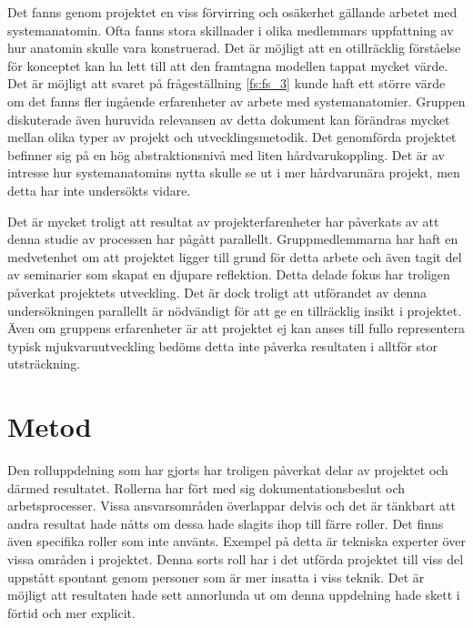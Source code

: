 

Det fanns genom projektet en viss förvirring och osäkerhet gällande arbetet med systemanatomin. Ofta fanns stora skillnader i olika medlemmars uppfattning av hur anatomin skulle vara konstruerad. Det är möjligt att en otillräcklig förståelse för konceptet kan ha lett till att den framtagna modellen tappat mycket värde. Det är möjligt att svaret på frågeställning \ref{fs:fs_3} kunde haft ett större värde om det fanns fler ingående erfarenheter av arbete med systemanatomier. Gruppen diskuterade även huruvida relevansen av detta dokument kan förändras mycket mellan olika typer av projekt och utvecklingsmetodik. Det genomförda projektet befinner sig på en hög abstraktionsnivå med liten hårdvarukoppling. Det är av intresse hur systemanatomins nytta skulle se ut i mer hårdvarunära projekt, men detta har inte undersökts vidare.

Det är mycket troligt att resultat av projekterfarenheter har påverkats av att denna studie av processen har pågått parallellt. Gruppmedlemmarna har haft en medvetenhet om att projektet ligger till grund för detta arbete och även tagit del av seminarier som skapat en djupare reflektion. Detta delade fokus har troligen påverkat projektets utveckling. Det är dock troligt att utförandet av denna undersökningen parallellt är nödvändigt för att ge en tillräcklig insikt i projektet. Även om gruppens erfarenheter är att projektet ej kan anses till fullo representera typisk mjukvaruutveckling bedöms detta inte påverka resultaten i alltför stor utsträckning.


\section{Metod}
\label{sec:discussion-method}
Den rolluppdelning som har gjorts har troligen påverkat delar av projektet och därmed resultatet. Rollerna har fört med sig dokumentationsbeslut och arbetsprocesser. Vissa ansvarsområden överlappar delvis och det är tänkbart att andra resultat hade nåtts om dessa hade slagits ihop till färre roller. Det finns även specifika roller som inte använts. Exempel på detta är tekniska experter över vissa områden i projektet. Denna sorts roll har i det utförda projektet till viss del uppstått spontant genom personer som är mer insatta i viss teknik. Det är möjligt att resultaten hade sett annorlunda ut om denna uppdelning hade skett i förtid och mer explicit.


